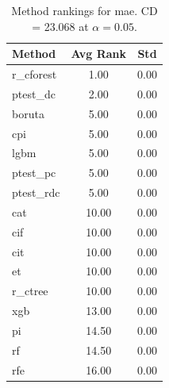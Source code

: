 \begin{table}[h]
\centering
\caption{Method rankings for mae. CD = 23.068 at $\alpha=0.05$.}
\label{tab:ranks_mae}
\begin{tabular}{lcc}
\toprule
Method & Avg Rank & Std \\
\midrule
r_cforest & 1.00 & 0.00 \\
ptest_dc & 2.00 & 0.00 \\
boruta & 5.00 & 0.00 \\
cpi & 5.00 & 0.00 \\
lgbm & 5.00 & 0.00 \\
ptest_pc & 5.00 & 0.00 \\
ptest_rdc & 5.00 & 0.00 \\
cat & 10.00 & 0.00 \\
cif & 10.00 & 0.00 \\
cit & 10.00 & 0.00 \\
et & 10.00 & 0.00 \\
r_ctree & 10.00 & 0.00 \\
xgb & 13.00 & 0.00 \\
pi & 14.50 & 0.00 \\
rf & 14.50 & 0.00 \\
rfe & 16.00 & 0.00 \\
\bottomrule
\end{tabular}
\end{table}